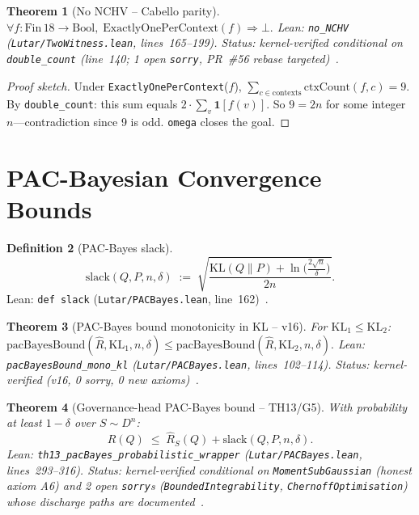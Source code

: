 \documentclass[11pt,letterpaper]{article}
\newtheorem{theorem}{Theorem}[section]
\theoremstyle{definition}
\newtheorem{definition}[theorem]{Definition}
\theoremstyle{remark}
\begin{document}
\begin{theorem}[No NCHV -- Cabello parity]
\label{thm:no-nchv}
\(
  \forall f : \mathrm{Fin}\,18 \to \mathrm{Bool},\;
  \mathrm{ExactlyOnePerContext}(f) \Rightarrow \bot.
\)
\textup{Lean:} \texttt{no\_NCHV}
(\texttt{Lutar/TwoWitness.lean}, lines~165--199).
Status: kernel-verified conditional on \texttt{double\_count}
(line~140; 1 open \texttt{sorry}, PR~\#56 rebase targeted)~\cite{LutarThesisV17}.
\end{theorem}
\begin{proof}[Proof sketch]
Under \texttt{ExactlyOnePerContext}(\(f\)),
\(\sum_{c \in \mathrm{contexts}} \mathrm{ctxCount}(f,c) = 9\).
By \texttt{double\_count}: this sum equals
\(2 \cdot \sum_{v} \mathbf{1}[f(v)]\).
So \(9 = 2n\) for some integer \(n\)---contradiction since 9 is odd.
\texttt{omega} closes the goal.
\end{proof}

\section{PAC-Bayesian Convergence Bounds}
\label{sec:pac-bayes}

\begin{definition}[PAC-Bayes slack]
\[
  \mathrm{slack}(Q,P,n,\delta) \;:=\;
  \sqrt{\frac{\mathrm{KL}(Q \| P) + \ln\bigl(\tfrac{2\sqrt{n}}{\delta}\bigr)}{2n}}.
\]
\textup{Lean:} \texttt{def slack}
(\texttt{Lutar/PACBayes.lean}, line~162)~\cite{LutarThesisV16}.
\end{definition}

\begin{theorem}[PAC-Bayes bound monotonicity in KL -- v16]
\label{thm:pac-mono}
For \(\mathrm{KL}_1 \le \mathrm{KL}_2\):
\(
  \mathrm{pacBayesBound}(\hat{R}, \mathrm{KL}_1, n, \delta)
  \le
  \mathrm{pacBayesBound}(\hat{R}, \mathrm{KL}_2, n, \delta).
\)
\textup{Lean:} \texttt{pacBayesBound\_mono\_kl}
(\texttt{Lutar/PACBayes.lean}, lines~102--114).
Status: kernel-verified (v16, 0 sorry, 0 new axioms)~\cite{LutarThesisV16}.
\end{theorem}

\begin{theorem}[Governance-head PAC-Bayes bound -- TH13/G5]
\label{thm:pac-main}
With probability at least \(1-\delta\) over \(S \sim D^n\):
\[
  R(Q) \;\le\; \hat{R}_S(Q) + \mathrm{slack}(Q,P,n,\delta).
\]
\textup{Lean:} \texttt{th13\_pacBayes\_probabilistic\_wrapper}
(\texttt{Lutar/PACBayes.lean}, lines~293--316).
Status: kernel-verified conditional on \texttt{MomentSubGaussian}
(honest axiom A6) and 2 open \texttt{sorry}s
(\texttt{BoundedIntegrability}, \texttt{ChernoffOptimisation})
whose discharge paths are documented~\cite{LutarThesisV16}.
\end{theorem}
\end{document}
